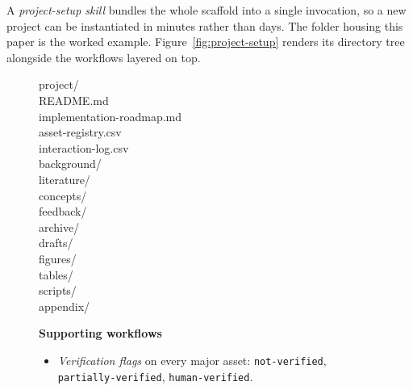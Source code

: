 \documentclass[11pt]{article}
\begin{document}
A \emph{project-setup skill} bundles the whole scaffold into a single invocation, so a new project can be instantiated in minutes rather than days. The folder housing this paper is the worked example. Figure~\ref{fig:project-setup} renders its directory tree alongside the workflows layered on top.

\begin{figure}[t]
  \centering
  \begin{minipage}[t]{0.46\textwidth}
    \vspace{0pt}
    \centering
{\footnotesize\ttfamily\raggedright
project/\\
\hspace*{1em}README.md\\
\hspace*{1em}implementation-roadmap.md\\
\hspace*{1em}asset-registry.csv\\
\hspace*{1em}interaction-log.csv\\
\hspace*{1em}background/\\
\hspace*{2em}literature/\\
\hspace*{2em}concepts/\\
\hspace*{2em}feedback/\\
\hspace*{2em}archive/\\
\hspace*{1em}drafts/\\
\hspace*{1em}figures/\\
\hspace*{1em}tables/\\
\hspace*{1em}scripts/\\
\hspace*{1em}appendix/\\
\par}
  \end{minipage}%
  \hfill
  \begin{minipage}[t]{0.50\textwidth}
    \vspace{0pt}
    \footnotesize
    \textbf{Supporting workflows}
    \begin{itemize}[leftmargin=*, itemsep=3pt, topsep=4pt]
      \item \emph{Verification flags} on every major asset: \texttt{not-verified}, \texttt{partially-verified}, \texttt{human-verified}.

\end{itemize}
\end{minipage}
\end{figure}
\end{document}
